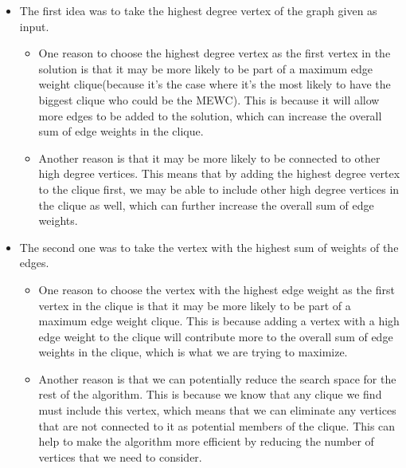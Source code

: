     \begin{itemize}
        \item The first idea was to take the highest degree vertex of the graph given as input. 
        \begin{itemize}
            \item One reason to choose the highest degree vertex as the first vertex in the solution is that it may be more likely to be part of a maximum edge weight clique(because it's the case where it's the most likely to have the biggest clique who could be the MEWC). This is because it will allow more edges to be added to the solution, which can increase the overall sum of edge weights in the clique.
            \item Another reason is that it may be more likely to be connected to other high degree vertices. This means that by adding the highest degree vertex to the clique first, we may be able to include other high degree vertices in the clique as well, which can further increase the overall sum of edge weights.
        \end{itemize}
        \item The second one was to take the vertex with the highest sum of weights of the edges.
        \begin{itemize}
            \item One reason to choose the vertex with the highest edge weight as the first vertex in the clique is that it may be more likely to be part of a maximum edge weight clique. This is because adding a vertex with a high edge weight to the clique will contribute more to the overall sum of edge weights in the clique, which is what we are trying to maximize.
            \item Another reason is that we can potentially reduce the search space for the rest of the algorithm. This is because we know that any clique we find must include this vertex, which means that we can eliminate any vertices that are not connected to it as potential members of the clique. This can help to make the algorithm more efficient by reducing the number of vertices that we need to consider.
        \end{itemize}
    \end{itemize}
    
